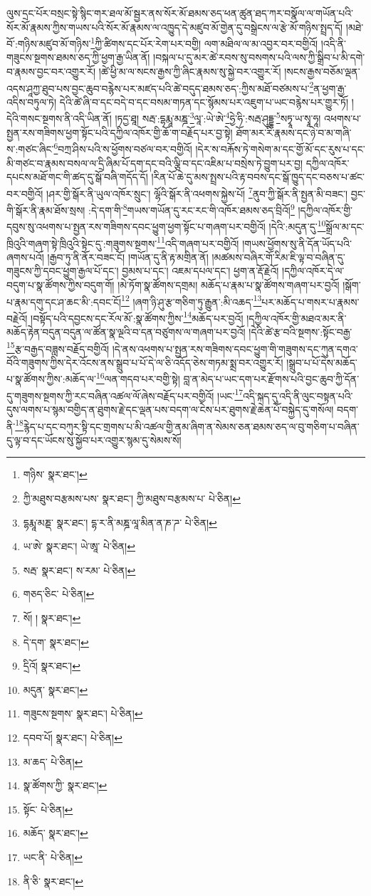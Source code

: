 ལུས་དྲང་པོར་བསྲང་སྟེ་སྙིང་གར་ཐལ་མོ་སྦྱར་ནས་སོར་མོ་ཐམས་ཅད་ཕན་ཚུན་ཐད་ཀར་བསྣོལ་ལ་གཡོན་པའི་སོར་མོ་རྣམས་ཀྱིས་གཡས་པའི་སོར་མོ་རྣམས་ལ་འཁྱུད་དེ་མཛུབ་མོ་གྱེན་དུ་བསྒྲེངས་ལ་རྩེ་མོ་གཉིས་སྤྲད་དོ། །མཐེ་བོ་:གཉིས་མཛུབ་མོ་གཉིས་\footnote{གཉིས་  སྣར་ཐང་། }ཀྱི་ཚིགས་དང་པོར་རེག་པར་བགྱི། ལག་མཐིལ་ལ་མ་འབྱར་བར་བགྱིའོ། །འདི་ནི་གཟུངས་སྔགས་ཐམས་ཅད་ཀྱི་ཕྱག་རྒྱ་ཡིན་ནོ། །བསྐལ་པ་དུ་མར་ཚེ་རབས་སུ་བསགས་པའི་ལས་ཀྱི་སྒྲིབ་པ་མི་དགེ་བ་རྣམས་བྱང་བར་འགྱུར་རོ། །ཚེ་ཕྱི་མ་ལ་སངས་རྒྱས་ཀྱི་ཞིང་རྣམས་སུ་སྐྱེ་བར་འགྱུར་རོ། །སངས་རྒྱས་བཅོམ་ལྡན་འདས་ཤཱཀྱ་ཐུབ་པས་བྱང་ཆུབ་བརྙེས་པར་མཛད་པའི་ཚེ་བདུད་ཐམས་ཅད་:ཀྱིས་མཐོ་བཙམས་པ་\footnote{ཀྱི་མཐུས་བརྩམས་པས་  སྣར་ཐང་། ཀྱི་མཐུས་བརྩམས་པ་  པེ་ཅིན། }ན་ཕྱག་རྒྱ་འདིས་བཏུལ་ཏེ། དེའི་ཚེ་ཞི་བ་དང་བདེ་བ་དང་བསམ་གཏན་དང་སྙོམས་པར་འཇུག་པ་ཡང་བརྙེས་པར་གྱུར་ཏོ། །དེའི་གསང་སྔགས་ནི་འདི་ཡིན་ནོ། །ཏདྱ་ཐཱ། སརྦ་:དྷརྨཱ་མཎྜ་\footnote{དྷརྨཱ་མཎྡ་  སྣར་ཐང་། དྷ་ར་ནི་མཎྜ་ལཱ་མིན་ན་ཎ་ཌ་  པེ་ཅིན། }ལཱ་:ཡེ་ཨེ་\footnote{ཡ་ཨེ་  སྣར་ཐང་། ཡེ་ཨཱ་  པེ་ཅིན། }ཧྱེ་ཧི་:སརྦ་ཤུདྡྷ་\footnote{སརྦ་  སྣར་ཐང་། ས་རམ་  པེ་ཅིན། }སཏྭཱ་ཡ་སྭཱ་ཧཱ། འཕགས་པ་སྤྱན་རས་གཟིགས་ཕྱག་སྟོང་པའི་དཀྱིལ་འཁོར་གྱི་ཆོ་ག་བརྗོད་པར་བྱ་སྟེ། ཐོག་མར་རི་རྣམས་དང་ཉེ་བ་མ་གཞི་ས་:གཙང་ཞིང་\footnote{གཅད་ཅིང་  པེ་ཅིན། }བཀྲ་ཤིས་པའི་ས་ཕྱོགས་བཙལ་བར་བགྱིའོ། །དེར་ས་བརྐོས་ཏེ་གསེག་མ་དང་གྱོ་མོ་དང་རུས་པ་དང་མི་གཙང་བ་རྣམས་བསལ་ལ་དྲི་ཞིམ་པོ་དག་དང་བའི་ལྕི་བ་དང་འཇིམ་པ་བསྲེས་ཏེ་བྱུག་པར་བྱ། དཀྱིལ་འཁོར་དཔངས་མཐོ་གང་གི་ཚད་དུ་སྒོ་བཞི་གདོད་དོ། །རིན་པོ་ཆེ་དུ་མས་སྤྲས་པའི་རྟ་བབས་དང་སྒོ་ཁྱུད་དང་བཅས་པ་ཚང་བར་བགྱིའོ། །ཤར་གྱི་སྒོར་ནི་ཡུལ་འཁོར་སྲུང་། ལྷོའི་སྒོར་ནི་འཕགས་སྐྱེས་པོ། \footnote{སོ། །   སྣར་ཐང་། }ནུབ་ཀྱི་སྒོར་ནི་སྤྱན་མི་བཟང་། བྱང་གི་སྒོར་ནི་རྣམ་ཐོས་སྲས། :དེ་དག་གི་\footnote{དེ་དག་  སྣར་ཐང་། }གཡས་གཡོན་དུ་རང་རང་གི་འཁོར་ཐམས་ཅད་བྲིའོ།\footnote{དྲིའོ།  སྣར་ཐང་། } །དཀྱིལ་འཁོར་གྱི་དབུས་སུ་འཕགས་པ་སྤྱན་རས་གཟིགས་དབང་ཕྱུག་ཕྱག་སྟོང་པ་གཞག་པར་བགྱིའོ། །དེའི་:མདུན་དུ་\footnote{མདུན་  སྣར་ཐང་། }སྒྲོལ་མ་དང་ཁྲིའུའི་གཞག་སྟེ་ཁྲིའུའི་སྟེང་དུ་:གཟུགས་སྔགས་\footnote{གཟུངས་སྔགས་  སྣར་ཐང་།  པེ་ཅིན། }འདི་གཞག་པར་བགྱིའོ། །གཡས་ཕྱོགས་སུ་ནི་དོན་ཡོད་པའི་ཞགས་པའོ། །རྒྱབ་ཏུ་ནི་ནོར་བཟང་ངོ། །གཡོན་དུ་ནི་རྟ་མགྲིན་ནོ། །མཚམས་བཞིར་གོ་རིམ་ཇི་ལྟ་བ་བཞིན་དུ་གཟུངས་ཀྱི་དབང་ཕྱུག་རྒྱལ་པོ་དང་། བྱམས་པ་དང་། འཇམ་དཔལ་དང་། ཕྱག་ན་རྡོ་རྗེའོ། །དཀྱིལ་འཁོར་དེ་ལ་བདུག་པ་སྣ་ཚོགས་ཀྱིས་བདུག་གོ། །མེ་ཏོག་སྣ་ཚོགས་དགྲམ། མཆོད་པ་རྣམ་པ་སྣ་ཚོགས་གཞག་པར་བྱའོ། །སྒོག་པ་རྣམ་དགུ་དང་ཤ་ཆང་མི་:དབང་ངོ།\footnote{དབབ་པོ།  སྣར་ཐང་།  པེ་ཅིན། } །ཞག་ཉི་ཤུ་རྩ་གཅིག་ཏུ་རྒྱུན་:མི་འཆད་\footnote{མ་ཆད་  པེ་ཅིན། }པར་མཆོད་པ་གསར་པ་རྣམས་བརྗེའོ། །བསྟོད་པའི་དབྱངས་དང་རོལ་མོ་:སྣ་ཚོགས་ཀྱིས་\footnote{སྣ་ཚོགས་ཀྱི་  སྣར་ཐང་། }མཆོད་པར་བྱའོ། །དཀྱིལ་འཁོར་གྱི་མཐའ་མར་ནི་མཆོད་རྟེན་བདུན་བདུན་ལ་ཚོན་སྣ་ལྔའི་བ་དན་བཙུགས་ལ་གཞག་པར་བྱའོ། །དེའི་ཚེ་རྩ་བའི་སྔགས་:སྟོང་བརྒྱ་\footnote{སྟོང་  པེ་ཅིན། }རྩ་བརྒྱད་བཟླས་བརྗོད་བགྱིའོ། །དེ་ནས་འཕགས་པ་སྤྱན་རས་གཟིགས་དབང་ཕྱུག་གི་གཟུགས་དང་ཀུན་དགའ་བོའི་གཟུགས་ཀྱིས་དེར་འོངས་ནས་སྒྲུབ་པ་པོ་དེ་ལ་ཅི་འདོད་ཅེས་གཏམ་སྨྲ་བར་འགྱུར་རོ། །སྒྲུབ་པ་པོ་དེས་མཆོད་པ་སྣ་ཚོགས་ཀྱིས་:མཆོད་ལ་\footnote{མཆོད་  སྣར་ཐང་། }ལན་གདབ་པར་བགྱི་སྟེ། བླ་ན་མེད་པ་ཡང་དག་པར་རྫོགས་པའི་བྱང་ཆུབ་ཀྱི་དོན་དུ་གཟུགས་སྔགས་ཀྱི་རང་བཞིན་འཚལ་ལོ་ཞེས་བརྗོད་པར་བགྱིའོ། །ཡང་\footnote{ཡང་ནི་  པེ་ཅིན། }འདི་སྐད་དུ་འདི་ནི་ལུང་བསྟན་པའི་དུས་ལགས་པ་སྙམ་བགྱིད་ན་ཐུགས་རྗེ་དང་ལྡན་པས་བདག་ལ་ངེས་པར་ཐུགས་རྗེ་ཆེན་པོ་བསྐྱེད་དུ་གསོལ། བདག་ནི་\footnote{ནི་ཅི་  སྣར་ཐང་། }རྙེད་པ་དང་བཀུར་སྟི་དང་གྲགས་པ་མི་འཚལ་གྱི་ནམ་ཞིག་ན་སེམས་ཅན་ཐམས་ཅད་ལ་བུ་གཅིག་པ་བཞིན་དུ་ལྟ་བ་དང་ཡོངས་སུ་སྐྱོབ་པར་འགྱུར་སྙམ་དུ་སེམས་སོ། 